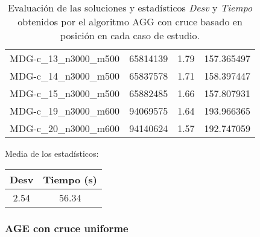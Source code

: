 \documentclass{article}
\begin{document}
\begin{table}[H]
\begin{tabular}{|cccc|}
		MDG-c\_13\_n3000\_m500 & 65814139 & 1.79 & 157.365497\\
		MDG-c\_14\_n3000\_m500 & 65837578 & 1.71 & 158.397447\\
		MDG-c\_15\_n3000\_m500 & 65882485 & 1.66 & 157.807931\\
		MDG-c\_19\_n3000\_m600 & 94069575 & 1.64 & 193.966365\\
		MDG-c\_20\_n3000\_m600 & 94140624 & 1.57 & 192.747059\\
		\hline
	\end{tabular}
	\caption{Evaluación de las soluciones y estadísticos \emph{Desv} y \emph{Tiempo} obtenidos por el algoritmo AGG con cruce basado en posición
		en cada caso de estudio.}
	\label{tab:agg-posicion}
\end{table}

Media de los estadísticos:
\begin{table}[H]
	\centering
	\begin{tabular}{|cc|}
		\hline
		Desv & Tiempo (s)\\ \hline
		2.54 & 56.34 \\
		\hline
	\end{tabular}
\end{table}

\pagebreak

\subsubsection*{AGE con cruce uniforme}
\end{document}

